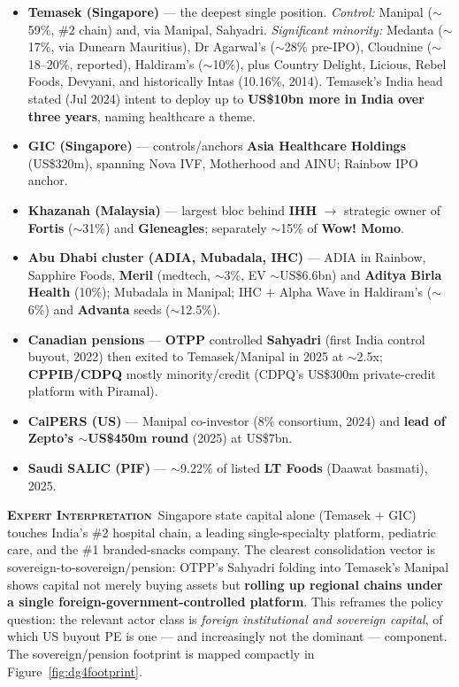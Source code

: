 \documentclass[11pt,a4paper]{article}
\newcommand{\EI}{\textcolor{eicol}{\textsc{\textbf{Expert Interpretation}}}}
\begin{document}
\begin{itemize}[leftmargin=1.4em,itemsep=3pt]
\item \textbf{Temasek (Singapore)} --- the deepest single position. \emph{Control:} Manipal ($\sim$59\%, \#2 chain) and, via Manipal, Sahyadri. \emph{Significant minority:} Medanta ($\sim$17\%, via Dunearn Mauritius), Dr Agarwal's ($\sim$28\% pre-IPO), Cloudnine ($\sim$18--20\%, reported), Haldiram's ($\sim$10\%), plus Country Delight, Licious, Rebel Foods, Devyani, and historically Intas (10.16\%, 2014). Temasek's India head stated (Jul 2024) intent to deploy up to \textbf{US\$10bn more in India over three years}, naming healthcare a theme.
\item \textbf{GIC (Singapore)} --- controls/anchors \textbf{Asia Healthcare Holdings} (US\$320m), spanning Nova IVF, Motherhood and AINU; Rainbow IPO anchor.
\item \textbf{Khazanah (Malaysia)} --- largest bloc behind \textbf{IHH} $\rightarrow$ strategic owner of \textbf{Fortis} ($\sim$31\%) and \textbf{Gleneagles}; separately $\sim$15\% of \textbf{Wow! Momo}.
\item \textbf{Abu Dhabi cluster (ADIA, Mubadala, IHC)} --- ADIA in Rainbow, Sapphire Foods, \textbf{Meril} (medtech, $\sim$3\%, EV $\sim$US\$6.6bn) and \textbf{Aditya Birla Health} (10\%); Mubadala in Manipal; IHC $+$ Alpha Wave in Haldiram's ($\sim$6\%) and \textbf{Advanta} seeds ($\sim$12.5\%).
\item \textbf{Canadian pensions} --- \textbf{OTPP} controlled \textbf{Sahyadri} (first India control buyout, 2022) then exited to Temasek/Manipal in 2025 at $\sim$2.5x; \textbf{CPPIB/CDPQ} mostly minority/credit (CDPQ's US\$300m private-credit platform with Piramal).
\item \textbf{CalPERS (US)} --- Manipal co-investor (8\% consortium, 2024) and \textbf{lead of Zepto's $\sim$US\$450m round} (2025) at US\$7bn.
\item \textbf{Saudi SALIC (PIF)} --- $\sim$9.22\% of listed \textbf{LT Foods} (Daawat basmati), 2025.
\end{itemize}

\EI\ Singapore state capital alone (Temasek $+$ GIC) touches India's \#2 hospital chain, a leading single-specialty platform, pediatric care, and the \#1 branded-snacks company. The clearest consolidation vector is sovereign-to-sovereign/pension: OTPP's Sahyadri folding into Temasek's Manipal shows capital not merely buying assets but \textbf{rolling up regional chains under a single foreign-government-controlled platform}. This reframes the policy question: the relevant actor class is \emph{foreign institutional and sovereign capital}, of which US buyout PE is one --- and increasingly not the dominant --- component. The sovereign/pension footprint is mapped compactly in Figure~\ref{fig:dg4footprint}.
\end{document}
